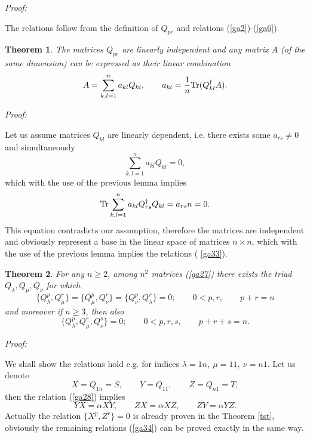 \documentclass[a4paper,a4paper]{article}
\newtheorem{theorem}{Theorem}
\begin{document}
\noindent \textit{Proof:}

\noindent The relations follow from the definition of $Q_{pr}$ and relations
(\ref{ga2})-(\ref{ga6}).

\begin{theorem}
The matrices $Q_{pr}$ are linearly independent and any matrix $A$ (of the
same dimension) can be expressed as their linear combination 
\begin{equation}
A=\sum_{k,l=1}^{n}a_{kl}Q_{kl},\qquad a_{kl}=\frac{1}{n}\text{\textrm{Tr}}%
(Q_{kl}^{\dagger }A).  \label{ga33}
\end{equation}
\end{theorem}

\noindent \textit{Proof:}

\noindent Let us assume matrices $Q_{kl}$ are linearly dependent, i.e. there
exists some $a_{rs}\neq 0$ and simultaneously%
\begin{equation*}
\sum_{k,l=1}^{n}a_{kl}Q_{kl}=0,
\end{equation*}%
which with the use of the previous lemma implies%
\begin{equation*}
\text{\textrm{Tr}}\sum_{k,l=1}^{n}a_{kl}Q_{rs}^{\dagger }Q_{kl}=a_{rs}n=0.
\end{equation*}%
This equation contradicts our assumption, therefore the matrices are
independent and obviously represent a base in the linear space of matrices $%
n\times n$, which with the use of the previous lemma implies the relations (%
\ref{ga33}).

\begin{theorem}
For any $n\geq 2$, among $n^2$ matrices (\ref{ga27}) there exists the triad $%
Q_\lambda ,Q_\mu ,Q_\nu $ for which 
\begin{equation}  \label{ga34}
\{Q_\lambda ^p,Q_\mu ^r\}=\{Q_\mu ^p,Q_\nu ^r\}=\{Q_\nu ^p,Q_\lambda
^r\}=0;\qquad 0<p,r,\qquad p+r=n
\end{equation}
and moreover if $n\geq 3$, then also 
\begin{equation}  \label{ga35}
\{Q_\lambda ^p,Q_\mu ^r,Q_\nu ^s\}=0;\qquad 0<p,r,s,\qquad p+r+s=n.
\end{equation}
\end{theorem}

\noindent \textit{Proof:}

\noindent We shall show the relations hold e.g. for indices $\lambda =1n,\
\mu =11,\ \nu =n1.$ Let us denote 
\begin{equation}
X=Q_{1n}=S,\qquad Y=Q_{11},\qquad Z=Q_{n1}=T,  \label{ga35.1}
\end{equation}%
then the relation (\ref{ga28}) implies 
\begin{equation}
YX=\alpha XY,\qquad ZX=\alpha XZ,\qquad ZY=\alpha YZ.  \label{gaa35}
\end{equation}%
Actually the relation $\{X^{p},Z^{r}\}=0$ is already proven in the Theorem %
\ref{tst}, obviously the remaining relations (\ref{ga34}) can be proved
exactly in the same way.
\end{document}
